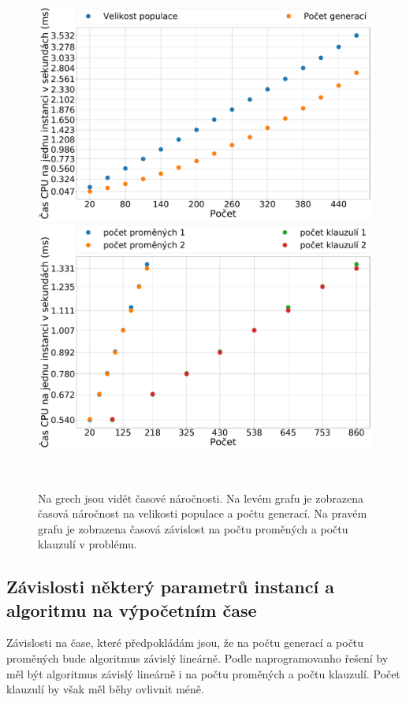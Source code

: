 \documentclass[11pt]{article}
\begin{document}
\begin{figure}
	\centering
    \begin{minipage}[c]{0.48\textwidth}
        \centering\includegraphics[width=\textwidth]{img/time_gen_cnt_sz.pdf} 
    \end{minipage}
    \begin{minipage}[c]{0.48\textwidth}
        \centering \includegraphics[width=\textwidth]{img/time_n_var_cla.pdf} 
    \end{minipage}
    \\
   \caption{Na grech jsou vidět časové náročnosti. Na levém grafu je zobrazena časová náročnost na velikosti populace a počtu generací. Na pravém grafu je zobrazena časová závislost na počtu proměných a počtu klauzulí v problému.}\label{fig:time}
\end{figure} 
\subsection{Závislosti některý parametrů instancí a algoritmu na výpočetním čase}
Závislosti na čase, které předpokládám jsou, že na počtu generací a počtu proměných bude algoritmus závislý lineárně. Podle naprogramovanho řešení by měl být algoritmus závislý lineárně i na počtu proměných a počtu klauzulí. Počet klauzulí by však měl běhy ovlivnit méně. 
\end{document}
